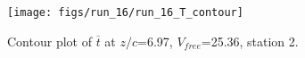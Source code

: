 \begin{figure}[H]
\centering
\texttt{[image: figs/run\_16/run\_16\_T\_contour]}
\caption{Contour plot of $\overline{t}$ at $z/c$=6.97, $V_{free}$=25.36, station 2.}
\label{fig:run_16_T_contour}
\end{figure}


